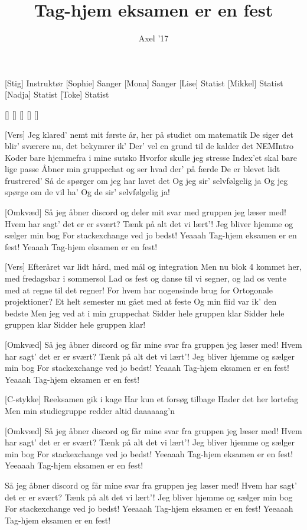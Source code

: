 \documentclass[a4paper,11pt]{article}
\title{Tag-hjem eksamen er en fest}
\author{Axel '17}
\begin{document}
\maketitle

\begin{roles}
[Stig] Instruktør
[Sophie] Sanger
[Mona] Sanger
[Lise] Statist
[Mikkel] Statist
[Nadja] Statist
[Toke] Statist
\end{roles}

\begin{props}
[]
[]
[]
[]
[]
\end{props}


\begin{song}
[Vers]%
Jeg klared' nemt mit første år, her på studiet om matematik
De siger det blir' sværere nu, det bekymrer ik'
Der' vel en grund til de kalder det NEMIntro
Koder bare hjemmefra i mine sutsko
Hvorfor skulle jeg stresse
Index'et skal bare lige passe
Åbner min gruppechat og ser hvad der' på færde
De er blevet lidt frustrered'
Så de spørger om jeg har lavet det
Og jeg sir' selvfølgelig ja
Og jeg spørge om de vil ha'
Og de sir' selvfølgelig ja!

[Omkvæd]%
Så jeg åbner discord og deler mit svar
med gruppen jeg læser med!
Hvem har sagt' det er er svært?
Tænk på alt det vi lært'!
Jeg bliver hjemme og sælger min bog
For stackexchange ved jo bedst!
Yeaaah
Tag-hjem eksamen er en fest!
Yeaaah
Tag-hjem eksamen er en fest!

[Vers]%
Efteråret var lidt hård, med mål og integration
Men nu blok 4 kommet her, med fredagsbar i sommersol
Lad os fest og danse til vi segner,
og lad os vente med at regne til det regner!
For hvem har nogensinde brug for
Ortogonale projektioner?
Et helt semester nu gået med at feste
Og min flid var ik' den bedste
Men jeg ved at i min gruppechat
Sidder hele gruppen klar
Sidder hele gruppen klar
Sidder hele gruppen klar!

[Omkvæd]%
Så jeg åbner discord og får mine svar
fra gruppen jeg læser med!
Hvem har sagt' det er er svært?
Tænk på alt det vi lært'!
Jeg bliver hjemme og sælger min bog
For stackexchange ved jo bedst!
Yeaaah
Tag-hjem eksamen er en fest!
Yeaaah
Tag-hjem eksamen er en fest!

[C-stykke]%
Reeksamen gik i kage
Har kun et forsøg tilbage
Hader det her lortefag
Men min studiegruppe redder altid daaaaaag'n

[Omkvæd]%
Så jeg åbner discord og får mine svar
fra gruppen jeg læser med!
Hvem har sagt' det er er svært?
Tænk på alt det vi lært'!
Jeg bliver hjemme og sælger min bog
For stackexchange ved jo bedst!
Yeeaaah
Tag-hjem eksamen er en fest!
Yeeaaah
Tag-hjem eksamen er en fest!

Så jeg åbner discord og får mine svar
fra gruppen jeg læser med!
Hvem har sagt' det er er svært?
Tænk på alt det vi lært'!
Jeg bliver hjemme og sælger min bog
For stackexchange ved jo bedst!
Yeeaaah
Tag-hjem eksamen er en fest!
Yeeaaah
Tag-hjem eksamen er en fest!
\end{song}
\end{document}
